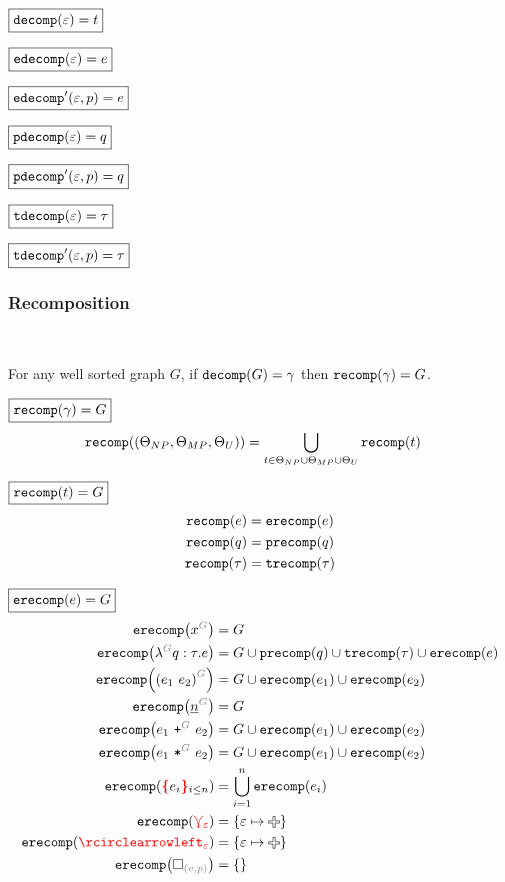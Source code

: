 \noindent $\boxed{\decomp{\e} = t}$
%
\figureDecompositionDefDecompTerm

\noindent $\boxed{\edecomp{\e} = e}$
%
\figureDecompositionDefEdecomp

\noindent $\boxed{\edecompPrime{\e}{p} = e}$
%
\figureDecompositionDefEdecompPrime

\noindent $\boxed{\pdecomp{\e} = q}$
%
\figureDecompositionDefPdecomp

\noindent $\boxed{\pdecompPrime{\e}{p} = q}$
%
\figureDecompositionDefPdecompPrime

\noindent $\boxed{\tdecomp{\e} = \tau}$
%
\figureDecompositionDefTdecomp

\noindent $\boxed{\tdecompPrime{\e}{p} = \tau}$
%
\figureDecompositionDefTdecompPrime%


\subsubsection{Recomposition}\hspace*{\fill} \\

\begin{theorem}
  For any well sorted graph $G$,
  if $\decomp{G} = \Grove$ then $\recomp{\Grove} = G$.
\end{theorem}

\noindent $\boxed{\recomp{\Grove} = G}$
%
\begin{align*}
  \recomp{(\Set[NP], \Set[MP], \Set[U])} &= \bigcup_{t \in \Set[NP] \cup \Set[MP] \cup \Set[U]} \recomp{t}
\end{align*}

\noindent $\boxed{\recomp{t} = G}$
%
\begin{align*}
  \recomp{e} &= \erecomp{e} \\
  \recomp{q} &= \precomp{q} \\
  \recomp{\tau} &= \trecomp{\tau}
\end{align*}

\noindent $\boxed{\erecomp{e} = G}$
%
\begin{align*}
  \erecomp{\eVar{G}{x}} &= G
  \\
  \erecomp{\eFun{G}{q}{\tau}{e}}
    &= G \cup \precomp{q} \cup \trecomp{\tau} \cup \erecomp{e}
  \\
  \erecomp{\eApp{G}{e_1}{e_2}}
    &= G \cup \erecomp{e_1} \cup \erecomp{e_2}
  \\
  \erecomp{\eNum{G}{n}} &= G
  \\
  \erecomp{\ePlus{G}{e_1}{e_2}}
    &= G \cup \erecomp{e_1} \cup \erecomp{e_2}
  \\
  \erecomp{\eTimes{G}{e_1}{e_2}}
    &= G \cup \erecomp{e_1} \cup \erecomp{e_2}
  \\
  \erecomp{\conflictHole[i \leq n]{e_i}}
  &= \bigcup_{i=1}^n \erecomp{e_i}
  \\
  \erecomp{\multiVertex{\e}} &= \SetOf{\e \mapsto \Plus}
  \\
  \erecomp{\cycleVertex{\e}} &= \SetOf{\e \mapsto \Plus}
  \\
  \erecomp{\emptyHole{v}{p}} &= \SetOf{}
\end{align*}

